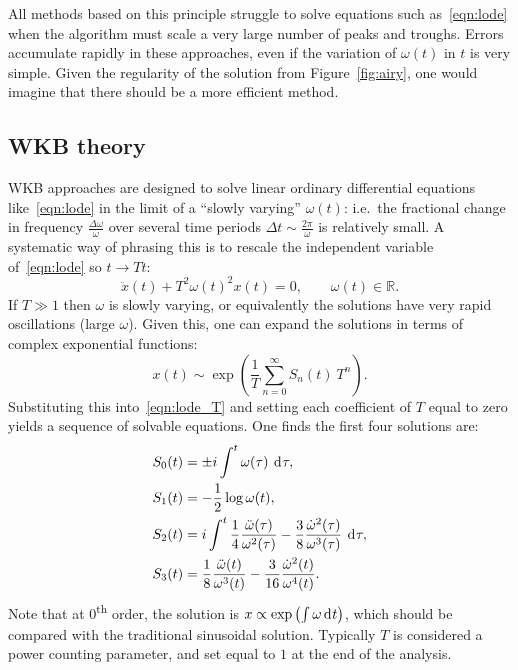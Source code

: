 All methods based on this principle struggle to solve equations such as~\eqref{eqn:lode} when the algorithm must scale a very large number of peaks and troughs. Errors accumulate rapidly in these approaches, even if the variation of \(\omega(t)\) in \(t\) is very simple. Given the regularity of the solution from Figure~\ref{fig:airy}, one would imagine that there should be a more efficient method.


\subsection{WKB theory}
\label{sec:wkb}
WKB approaches are designed to solve linear ordinary differential equations like~\eqref{eqn:lode} in the limit of a ``slowly varying'' \(\omega(t)\): i.e.\ the fractional change in frequency \(\frac{\Delta\omega}{\omega}\) over several time periods \(\Delta t \sim \frac{2\pi}{\omega}\) is relatively small.
A systematic way of phrasing this is to rescale the independent variable of~\eqref{eqn:lode} so \(t\rightarrow T t\):
\begin{equation}
  \ddot{x}(t) + T^2{\omega(t)}^2x(t) = 0,\qquad \omega(t)\in\mathbb{R}.
  \label{eqn:lode_T}
\end{equation}
If \(T\gg1\) then \(\omega\) is slowly varying, or equivalently the solutions have very rapid oscillations (large \(\omega\)). Given this, one can expand the solutions in terms of complex exponential functions:
\begin{equation}
  x(t)\sim \exp\left( \frac{1}{T}\sum\limits_{n=0}^{\infty} S_n(t)\: T^n \right).
  \label{eqn:asymp}
\end{equation}
Substituting this into~\eqref{eqn:lode_T} and setting each coefficient of \(T\) equal to zero yields a sequence of solvable equations. One finds the first four solutions are:
\begin{align}
  S_0(t) &= \pm i \int^t \omega(\tau)\: \operatorname{d}^{}\!{\tau},
  \label{eqn:S0}\\
  S_1(t) &= -\frac{1}{2}\log \omega(t),\\
  S_2(t) &=  i \int^t \frac{1}{4}\frac{\ddot{\omega}(\tau)}{\omega^{2}(\tau)} - \frac{3}{8}\frac{\dot{\omega}^2(\tau)}{\omega^{3}(\tau)}\: \operatorname{d}^{}\!{\tau}, \\
  S_3(t) &=  \frac{1}{8}\frac{\ddot{\omega}(t)}{\omega^{3}(t)} - \frac{3}{16} \frac{\dot{\omega}^{2}(t)}{\omega^{4}(t)}.
\end{align}
Note that at \(0\)\textsuperscript{th} order, the solution is \(x\propto\exp\left( \int \omega \operatorname{d}^{}\!{t} \right)\), which should be compared with the traditional sinusoidal solution.
Typically \(T\) is considered a power counting parameter, and set equal to \(1\) at the end of the analysis.

